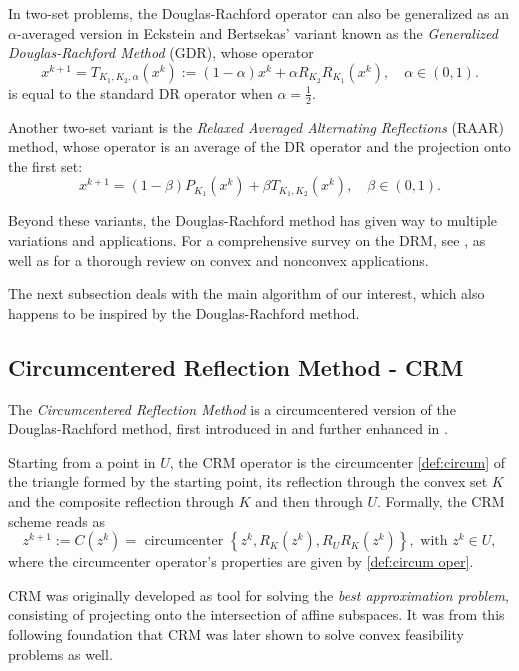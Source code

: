 \documentclass[smallextended,numbook,nospthms]{svjour3}
\theoremstyle{plain}
\theoremstyle{definition}
\begin{document}
In two-set problems, the Douglas-Rachford operator can also be generalized as an $\alpha$-averaged version in Eckstein and Bertsekas' \cite{Eckstein:1992} variant known as the \emph{Generalized Douglas-Rachford Method} (GDR), whose operator
$$
x^{k+1}=T_{K_1, K_2, \alpha}\left(x^{k}\right):=(1-\alpha) x^{k}+\alpha R_{K_2} R_{K_1}\left(x^{k}\right), \quad \alpha \in (0,1).
$$
is equal to the standard DR operator when $\alpha=\frac{1}{2}$.

Another two-set variant is the \emph{Relaxed Averaged Alternating Reflections} (RAAR) \cite{Luke:2005} method, whose operator is an average of the DR operator and the projection onto the first set:
$$
x^{k+1}=(1-\beta) P_{K_1}\left(x^{k}\right)+\beta T_{K_1, K_2}\left(x^{k}\right), \quad \beta \in (0,1).
$$

Beyond these variants, the Douglas-Rachford method has given way to multiple variations and applications. For a comprehensive survey on the DRM, see \cite{Lindstrom:2018uc}, as well as \cite{AragonArtacho:2019ug} for a thorough review on convex and nonconvex applications.

The next subsection deals with the main algorithm of our interest, which also happens to be inspired by the Douglas-Rachford method.

\newpage
\subsection{Circumcentered Reflection Method - CRM}\label{subsec:CRM}

The \emph{Circumcentered Reflection Method} is a circumcentered version of the Douglas-Rachford method, first introduced in \cite{Behling:2018a,Behling:2018} and further enhanced in \cite{Arefidamghani:2020,Bauschke:2018ut,Bauschke:2018wa, Bauschke:2019uh,Bauschke:2020a,Behling:2019dj,Behling:2020,Dizon:2019vq,Dizon:2020a,Ouyang:2018gu,Lindstrom:2020a}.

Starting from a point in $U$, the CRM operator is the circumcenter \cref{def:circum} of the triangle formed by the starting point, its reflection through the convex set $K$ and the composite reflection through $K$ and then through $U$. Formally, the CRM scheme reads as
\[
z^{k+1}:=C\left(z^{k}\right)=\text { circumcenter }\left\{z^{k}, R_{K}\left(z^{k}\right), R_{U} R_{K}\left(z^{k}\right)\right\}, \text { with } z^{k} \in U \label{eq:CRM},
\]
where the circumcenter operator's properties are given by \cref{def:circum oper}.

CRM was originally developed as tool for solving the \emph{best approximation problem}, consisting of projecting onto the intersection of affine subspaces. It was from this following foundation that CRM was later shown to solve convex feasibility problems as well.
\end{document}
